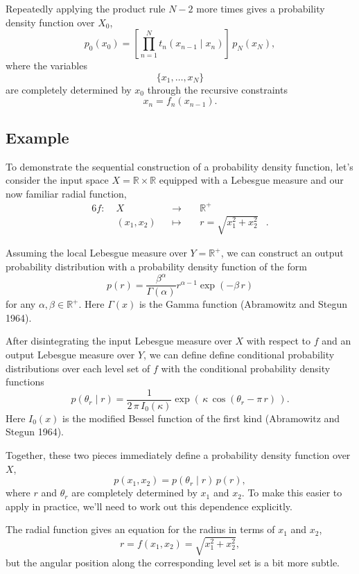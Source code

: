 \documentclass[
  letterpaper,
  DIV=11,
  numbers=noendperiod]{scrartcl}
\begin{document}
Repeatedly applying the product rule \(N - 2\) more times gives a
probability density function over \(X_{0}\), \[
p_{0}( x_{0} )
=
\left[
  \prod_{n = 1}^{N} t_{n}( x_{n - 1} \mid x_{n} )
\right] \,
p_{N} (x_{N}),
\] where the variables \[
\{ x_{1}, \ldots, x_{N} \}
\] are completely determined by \(x_{0}\) through the recursive
constraints \[
x_{n} = f_{n}( x_{n - 1} ).
\]

\subsection{Example}\label{sec:build-ex}

To demonstrate the sequential construction of a probability density
function, let's consider the input space
\(X = \mathbb{R} \times \mathbb{R}\) equipped with a Lebesgue measure
and our now familiar radial function, \begin{alignat*}{6}
f :\; &X& &\rightarrow& \; &\mathbb{R}^{+}&
\\
&(x_{1}, x_{2})& &\mapsto& &r = \sqrt{ x_{1}^{2} + x_{2}^{2} }&.
\end{alignat*}

Assuming the local Lebesgue measure over \(Y = \mathbb{R}^{+}\), we can
construct an output probability distribution with a probability density
function of the form \[
p(r) =
\frac{ \beta^{\alpha} }{ \Gamma( \alpha ) }
r^{\alpha - 1} \exp( - \beta \, r )
\] for any \(\alpha, \beta \in \mathbb{R}^{+}\). Here \(\Gamma(x)\) is
the Gamma function (Abramowitz and Stegun 1964).

After disintegrating the input Lebesgue measure over \(X\) with respect
to \(f\) and an output Lebesgue measure over \(Y\), we can define define
conditional probability distributions over each level set of \(f\) with
the conditional probability density functions \[
p( \theta_{r} \mid r )
=
\frac{1}{2 \, \pi \, I_{0}(\kappa) }
\exp( \, \kappa \, \cos( \theta_{r} - \pi \, r) \, ).
\] Here \(I_{0}(x)\) is the modified Bessel function of the first kind
(Abramowitz and Stegun 1964).

Together, these two pieces immediately define a probability density
function over \(X\), \[
p( x_{1}, x_{2} )
=
p( \theta_{r} \mid r ) \, p( r ),
\] where \(r\) and \(\theta_{r}\) are completely determined by \(x_{1}\)
and \(x_{2}\). To make this easier to apply in practice, we'll need to
work out this dependence explicitly.

The radial function gives an equation for the radius in terms of
\(x_{1}\) and \(x_{2}\), \[
r = f(x_{1}, x_{2}) = \sqrt{ x_{1}^{2} + x_{2}^{2} },
\] but the angular position along the corresponding level set is a bit
more subtle.
\end{document}
